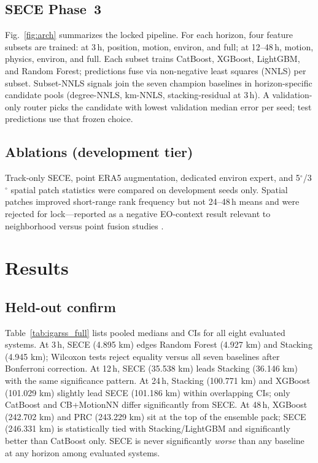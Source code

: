 \documentclass[conference]{IEEEtran}
\newcommand{\sece}{SECE}
\newcommand{\era}{ERA5}
\newcommand{\km}{\,km}
\begin{document}
\subsection{\sece{} Phase~3}
Fig.~\ref{fig:arch} summarizes the locked pipeline.
For each horizon, four feature subsets are trained: at 3\,h, position, motion, environ, and full; at 12--48\,h, motion, physics, environ, and full.
Each subset trains CatBoost, XGBoost, LightGBM, and Random Forest; predictions fuse via non-negative least squares (NNLS) per subset.
Subset-NNLS signals join the seven champion baselines in horizon-specific candidate pools (degree-NNLS, km-NNLS, stacking-residual at 3\,h).
A validation-only router picks the candidate with lowest validation median error per seed; test predictions use that frozen choice.

\subsection{Ablations (development tier)}
Track-only \sece{}, point \era{} augmentation, dedicated environ expert, and 5$^\circ$/3$^\circ$ spatial patch statistics were compared on development seeds only.
Spatial patches improved short-range rank frequency but not 24--48\,h means and were rejected for lock---reported as a negative EO-context result relevant to neighborhood versus point fusion studies \cite{liu2020,lee2021}.

\section{Results}
\subsection{Held-out confirm}
Table~\ref{tab:igarss_full} lists pooled medians and CIs for all eight evaluated systems.
At 3\,h, \sece{} (4.895\,\km{}) edges Random Forest (4.927\,\km{}) and Stacking (4.945\,\km{}); Wilcoxon tests reject equality versus all seven baselines after Bonferroni correction.
At 12\,h, \sece{} (35.538\,\km{}) leads Stacking (36.146\,\km{}) with the same significance pattern.
At 24\,h, Stacking (100.771\,\km{}) and XGBoost (101.029\,\km{}) slightly lead \sece{} (101.186\,\km{}) within overlapping CIs; only CatBoost and CB+MotionNN differ significantly from \sece{}.
At 48\,h, XGBoost (242.702\,\km{}) and PRC (243.229\,\km{}) sit at the top of the ensemble pack; \sece{} (246.331\,\km{}) is statistically tied with Stacking/LightGBM and significantly better than CatBoost only.
\sece{} is never significantly \emph{worse} than any baseline at any horizon among evaluated systems.
\end{document}
